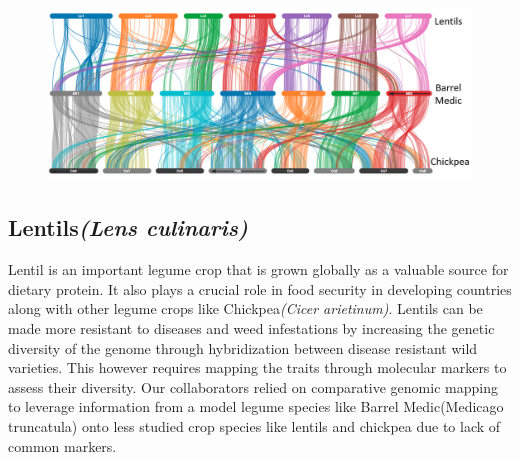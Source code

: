 \begin{figure}
  \centering
  \includegraphics[width=1\linewidth]{images/ch_6_lentils.png}
  \label{fig:ch_6_lentils}
\end{figure}


\subsection{Lentils\textit{(Lens culinaris)}}
Lentil is an important legume crop that is grown globally as a valuable source for dietary protein. It also plays a crucial role in food security in developing countries along with other legume crops like Chickpea\textit{(Cicer arietinum)}\cite{varshney2013draft}. Lentils can be made more resistant to diseases and weed infestations by increasing the genetic diversity of the genome through hybridization between disease resistant wild varieties. This however requires mapping the traits through molecular markers to assess their diversity. Our collaborators relied on comparative genomic mapping to leverage information from a model legume species like Barrel Medic(Medicago truncatula) onto less studied crop species like lentils and chickpea due to lack of common markers.

